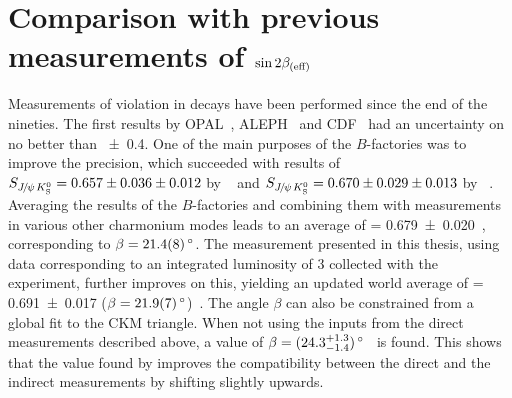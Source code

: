 
\section{Comparison with previous measurements of \texorpdfstring{$\sintwobetaoreff$}{sin2beta(eff)}}
\label{sec:discussion:sin2betahistory}

Measurements of \CP violation in \BdToJPsiKS decays have been performed since
the end of the nineties. The first results by OPAL~\cite{OPAL_sin2beta},
ALEPH~\cite{ALEPH_sin2beta} and CDF~\cite{CDF_sin2beta} had an uncertainty on
\sintwobeta no better than \num{\pm0.4}. One of the main purposes of the
$B$-factories was to improve the precision, which succeeded with results of
$\SJpsiKS = \num[parse-numbers=false]{0.657\pm0.036\pm0.012}$ by
\babar~\cite{BaBar_sin2beta} and $\SJpsiKS =
\num[parse-numbers=false]{0.670\pm0.029\pm0.013}$ by
\belle~\cite{Belle_sin2beta}. Averaging the results of the $B$-factories and
combining them with measurements in various other charmonium modes leads to an
average of \sintwobeta = \num{0.679\pm0.020}~\cite{HFAG}, corresponding to
$\beta = \SI{21.4\pm0.8}{\degrees}$. The measurement presented in this thesis,
using data corresponding to an integrated luminosity of \SI{3}{\invfb}
collected with the \lhcb experiment, further improves on this, yielding an
updated world average of \sintwobeta = \num{0.691\pm0.017} ($\beta =
\SI{21.9\pm0.7}{\degrees}$)~\cite{HFAG}. The angle $\beta$ can also be
constrained from a global fit to the CKM triangle. When not using the inputs
from the direct measurements described above, a value of $\beta = (24.3
^{+1.3}_{-1.4})\,\degrees$~\cite{CKMfitter} is found. This shows that the
value found by \lhcb improves the compatibility between the direct and the
indirect measurements by shifting \sintwobeta slightly upwards.

